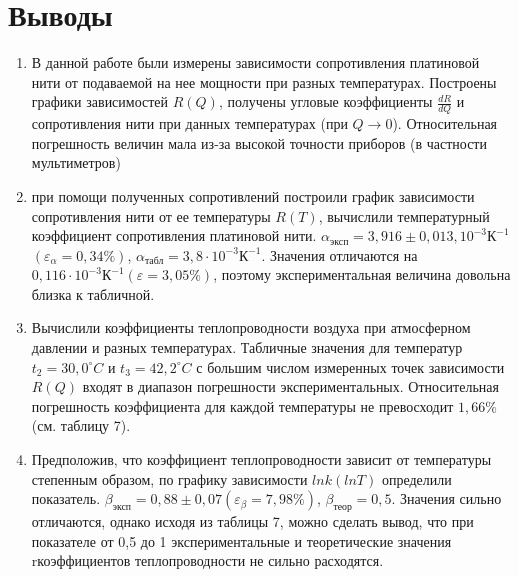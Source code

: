 \documentclass[a4paper]{article}
\begin{document}
\section{Выводы}
\begin{enumerate}
\item В данной работе были измерены зависимости сопротивления платиновой нити от подаваемой на нее мощности при разных температурах. Построены графики зависимостей $R(Q)$, получены угловые коэффициенты $\frac{dR}{dQ}$ и сопротивления нити при данных температурах (при $Q \rightarrow 0$). Относительная погрешность величин мала из-за высокой точности приборов (в частности мультиметров)
\item при помощи полученных сопротивлений построили график зависимости сопротивления нити от ее температуры $R(T)$, вычислили температурный коэффициент сопротивления платиновой нити. $\alpha_{\text{эксп}} =  3,916 \pm 0,013, 10^{-3} \text{К}^{-1}$ $(\varepsilon_{\alpha} = 0,34\%)$,  $\alpha_{\text{табл}} = 3,8 \cdot 10^{-3} \text{К}^{-1}$. Значения отличаются на $0,116 \cdot 10^{-3} \text{К}^{-1} (\varepsilon = 3,05 \%)$, поэтому экспериментальная величина довольна близка к табличной.
\item Вычислили коэффициенты теплопроводности воздуха при атмосферном давлении и разных температурах. Табличные значения для температур $t_2 = 30,0 ^\circ C$ и $t_3 = 42,2 ^\circ C$ с большим числом измеренных точек зависимости $R(Q)$ входят в диапазон погрешности экспериментальных. Относительная погрешность коэффициента для каждой температуры не превосходит $1,66 \%$ (см. таблицу 7).
\item Предположив, что коэффициент теплопроводности зависит от температуры степенным образом, по графику зависимости $lnk(lnT)$ определили показатель. $\beta_{\text{эксп}} = 0,88 \pm 0,07 (\varepsilon_\beta = 7,98 \%)$, $\beta_{\text{теор}} = 0,5$. Значения сильно отличаются, однако исходя из таблицы 7, можно сделать вывод, что при показателе от 0,5 до 1 экспериментальные и теоретические значения rкоэффициентов теплопроводности не сильно расходятся.
\end{enumerate}
\end{document}
